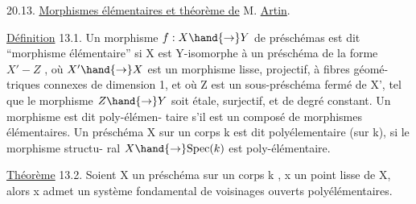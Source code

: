 
20.13. \uline{Morphismes élémentaires et théorème de} M. \uline{Artin}.

\uline{Définition} 13.1. Un morphisme $f:X\hand{\to} Y$ de préschémas est dit ``morphisme
 élémentaire'' si X est  Y-isomorphe à un préschéma de la forme
$X' - Z$ , où $X'\hand{\to} X$ est un morphisme lisse, projectif, à fibres géomé-%
triques connexes de dimension 1, et où Z est un sous-préschéma fermé
de X',  tel que le morphisme $Z\hand{\to} Y$ soit étale, surjectif, et
de degré constant. Un morphisme est dit  poly-élémen-%
taire s'il est un composé de morphismes élémentaires. Un préschéma X
sur un corps k est dit polyélementaire (sur k), si le morphisme structu-%
ral $X\hand{\to} \mathrm{Spec}(k)$ est poly-élémentaire.

\uline{Théorème} 13.2.  Soient X un préschéma  sur un corps k , x un point lisse
de X, alors x admet un système fondamental de voisinages ouverts
polyélémentaires.

